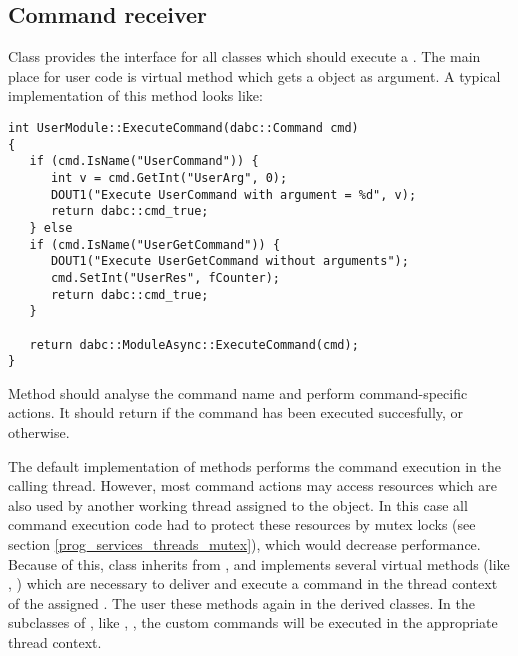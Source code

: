\subsection{Command receiver}

Class  provides the interface for all classes
which should execute a .
The main place for user code is virtual method  
which gets a  
object as argument. 
A typical implementation of this method looks like:

\begin{small}
\begin{verbatim}
int UserModule::ExecuteCommand(dabc::Command cmd)
{
   if (cmd.IsName("UserCommand")) {
      int v = cmd.GetInt("UserArg", 0);
      DOUT1("Execute UserCommand with argument = %d", v);
      return dabc::cmd_true;
   } else
   if (cmd.IsName("UserGetCommand")) {
      DOUT1("Execute UserGetCommand without arguments");
      cmd.SetInt("UserRes", fCounter);
      return dabc::cmd_true;
   } 
      
   return dabc::ModuleAsync::ExecuteCommand(cmd);
}
\end{verbatim}     
\end{small}
 
Method  should analyse the command name and perform command-specific
actions. It should return  if the command has been executed 
succesfully, or  otherwise.  

The default implementation of  methods performs 
the command execution in the calling thread.
However, most command actions may access resources which are also
used by another working thread assigned to the  object.
In this case all command execution code had to protect these resources
by mutex locks (see section \ref{prog_services_threads_mutex}), which
would decrease performance. Because of this, class
 inherits from ,
and implements several virtual methods (like , ) 
which are necessary to deliver and execute a command in the thread context of the
assigned .
The user  these methods again in the derived classes.
In the \dabc~ subclasses of , like , , the custom commands will be executed 
in the appropriate thread context.  

